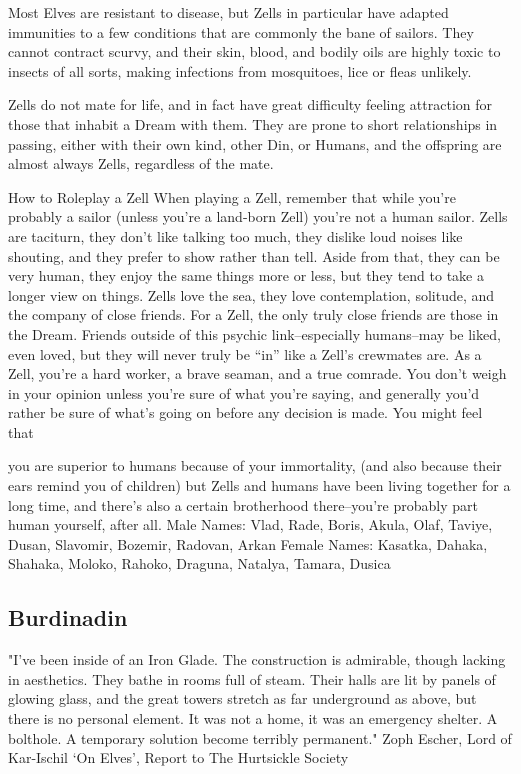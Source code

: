 \documentclass[oneside,11pt,english]{book}
\begin{document}
 

Most Elves are resistant to disease, but Zells in particular have adapted immunities to a few conditions 
that are commonly the bane of sailors. They cannot contract scurvy, and their skin, blood, and bodily oils 
are highly toxic to insects of all sorts, making infections from mosquitoes, lice or fleas unlikely. 

 

Zells do not mate for life, and in fact have great difficulty feeling attraction for those that inhabit a Dream 
with them. They are prone to short relationships in passing, either with their own kind, other Din, or 
Humans, and the offspring are almost always Zells, regardless of the mate. 

 

How to Roleplay a Zell 
When playing a Zell, remember that while you’re probably a sailor (unless you’re a land-born Zell) 
you’re not a human sailor. Zells are taciturn, they don’t like talking too much, they dislike loud noises 
like shouting, and they prefer to show rather than tell. Aside from that, they can be very human, they 
enjoy the same things more or less, but they tend to take a longer view on things. Zells love the sea, they 
love contemplation, solitude, and the company of close friends. For a Zell, the only truly close friends are 
those in the Dream. Friends outside of this psychic link--especially humans--may be liked, even loved, 
but they will never truly be “in” like a Zell’s crewmates are. As a Zell, you’re a hard worker, a brave 
seaman, and a true comrade. You don’t weigh in your opinion unless you’re sure of what you’re saying, 
and generally you’d rather be sure of what’s going on before any decision is made. You might feel that 


you are superior to humans because of your immortality, (and also because their ears remind you of 
children) but Zells and humans have been living together for a long time, and there’s also a certain 
brotherhood there--you’re probably part human yourself, after all. 
Male Names: Vlad, Rade, Boris, Akula, Olaf, Taviye, Dusan, Slavomir, Bozemir, Radovan, Arkan 
Female Names: Kasatka, Dahaka, Shahaka, Moloko, Rahoko, Draguna, Natalya, Tamara, Dusica 
 
\subsection{Burdinadin} 
"I've been inside of an Iron Glade. The construction is admirable, though lacking in aesthetics. They bathe in rooms full of steam. 
Their halls are lit by panels of glowing glass, and the great towers stretch as far underground as above, but there is no personal 
element. It was not a home, it was an emergency shelter. A bolthole. A temporary solution become terribly permanent." 
Zoph Escher, Lord of Kar-Ischil 
‘On Elves’, Report to The Hurtsickle Society 
\end{document}
